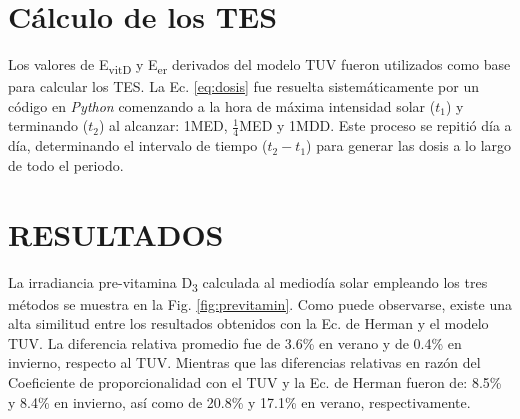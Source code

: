 \documentclass[10pt,twocolumn]{article}
\begin{document}
\section{Cálculo de los TES}
Los valores de E\textsubscript{vitD} y E\textsubscript{er} derivados del modelo TUV fueron utilizados como base para calcular los TES. La Ec. \ref{eq:dosis} fue resuelta sistemáticamente por un código en \emph{Python} comenzando a la hora de máxima intensidad solar ($t_1$) y terminando ($t_2$) al alcanzar: 1MED, $\frac{1}{4}$MED y 1MDD. Este proceso se repitió día a día, determinando el intervalo de tiempo ($t_2-t_1$) para generar las dosis a lo largo de todo el periodo.

\section{RESULTADOS}
La irradiancia pre-vitamina D\textsubscript{3} calculada al mediodía solar empleando los tres métodos se muestra en la Fig. \ref{fig:previtamin}. Como puede observarse, existe una alta similitud entre los resultados obtenidos con la Ec. de Herman y el modelo TUV. La diferencia relativa promedio fue de 3.6\% en verano y de 0.4\% en invierno, respecto al TUV. Mientras que las diferencias relativas en razón del Coeficiente de proporcionalidad con el TUV y la Ec. de Herman fueron de: 8.5\% y 8.4\% en invierno, así como de 20.8\% y 17.1\% en verano, respectivamente.
\end{document}
